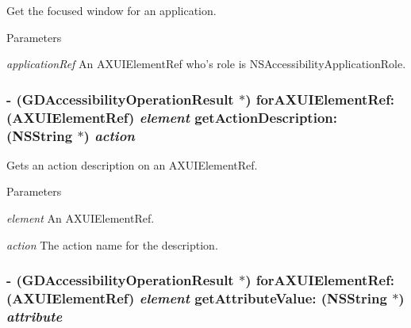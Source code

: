 Get the focused window for an application. 
\begin{DoxyParams}{Parameters}
\item[{\em applicationRef}]An AXUIElementRef who's role is NSAccessibilityApplicationRole. \end{DoxyParams}
\hypertarget{interface_g_d_accessibility_manager_aec013555193c1fade98e5ae3e36f953b}{
\subsubsection[{forAXUIElementRef:getActionDescription:}]{\setlength{\rightskip}{0pt plus 5cm}-\/ ({\bf GDAccessibilityOperationResult} $\ast$) forAXUIElementRef: (AXUIElementRef) {\em element}\/ getActionDescription: ({\bf NSString} $\ast$) {\em action}}}
\label{interface_g_d_accessibility_manager_aec013555193c1fade98e5ae3e36f953b}


Gets an action description on an AXUIElementRef. 
\begin{DoxyParams}{Parameters}
\item[{\em element}]An AXUIElementRef. \item[{\em action}]The action name for the description. \end{DoxyParams}
\hypertarget{interface_g_d_accessibility_manager_a07aa52aa7ad4f2a130e8448bc8bedf47}{
\subsubsection[{forAXUIElementRef:getAttributeValue:}]{\setlength{\rightskip}{0pt plus 5cm}-\/ ({\bf GDAccessibilityOperationResult} $\ast$) forAXUIElementRef: (AXUIElementRef) {\em element}\/ getAttributeValue: ({\bf NSString} $\ast$) {\em attribute}}}
\label{interface_g_d_accessibility_manager_a07aa52aa7ad4f2a130e8448bc8bedf47}


